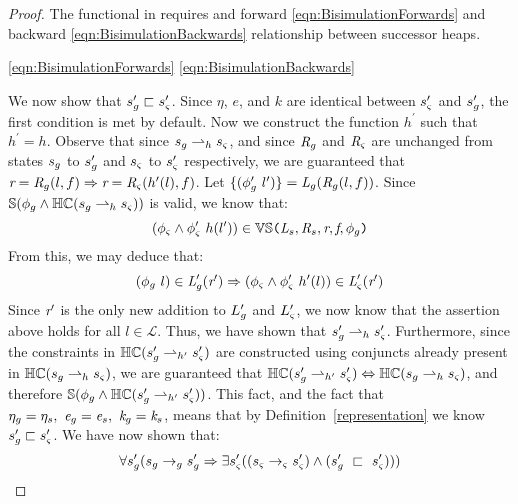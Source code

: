 \begin{proof}
The functional in  requires and forward
\eqref{eqn:BisimulationForwards} and backward
\eqref{eqn:BisimulationBackwards} relationship between successor
heaps.



\eqref{eqn:BisimulationForwards}
\eqref{eqn:BisimulationBackwards}


We now show that $s_{g}^\prime \sqsubset s_{\varsigma}^\prime$. Since $\eta$, $e$, and $k$ are identical between $s_{\varsigma}^\prime$ and $s_{g}^\prime $, the first condition is met by default. Now we construct the function $h^\prime$ such that $h^\prime = h$. Observe that since $s_{g} \rightharpoonup_{h} s_{\varsigma}$, and since $\emph{R}_{g}$ and $\emph{R}_{\varsigma}$ are unchanged from states $s_{g}$ to $s_{g}^\prime$ and $s_{\varsigma}$ to $s_{\varsigma}^\prime$ respectively, we are guaranteed that $ \emph{r} = \emph{R}_{g}(l,f) \Rightarrow \emph{r} = \emph{R}_{\varsigma}(h^\prime(l),f)$. Let $\{(\phi_{g}^\prime\ l^\prime)\} =  \emph{L}_{g}(\emph{R}_{g}(l,f))$. Since $\mathbb{S}(\phi_g \wedge \mathbb{HC}(s_{g} \rightharpoonup_{h} s_{\varsigma}))$ is valid, we know that:
 $$(\phi_{\varsigma} \wedge \phi_{\varsigma}^\prime\ h(l^\prime)) \in \mathbb{VS}\texttt{(} \emph{L}_{s},\emph{R}_{s},\emph{r},\emph{f},\phi_g\texttt{)}$$ 
From this, we may deduce that:
$$ (\phi_{g}\ l) \in \emph{L}_{g}^\prime(\emph{r}^\prime) \Rightarrow (\phi_{\varsigma} \wedge \phi_{\varsigma}^\prime\ h^\prime(l))\in \emph{L}_{\varsigma}^\prime(\emph{r}^\prime)$$
Since $\emph{r}^\prime$ is the only new addition to $L_{g}^\prime$ and $L_{\varsigma}^\prime$, we now know that the assertion above holds for all $l \in \mathcal{L}$. Thus, we have shown that $s_{g}^\prime \rightharpoonup_{h} s_{\varsigma}^\prime$. Furthermore, since the constraints in $\mathbb{HC}(s_{g}^\prime \rightharpoonup_{h^\prime} s_{\varsigma}^\prime)$ are constructed using conjuncts already present in $ \mathbb{HC}(s_{g} \rightharpoonup_{h} s_{\varsigma})$, we are guaranteed that $\mathbb{HC}(s_{g}^\prime \rightharpoonup_{h^\prime} s_{\varsigma}^\prime) \Leftrightarrow \mathbb{HC}(s_{g} \rightharpoonup_{h} s_{\varsigma})$, and therefore $\mathbb{S}(\phi_g \wedge \mathbb{HC}(s_{g}^\prime \rightharpoonup_{h^\prime} s_{\varsigma}^\prime))$. This fact, and the fact that $\eta_{g} = \eta_{s} ,\ \emph{e}_{g} = \emph{e}_{s} ,\ \emph{k}_{g} = \emph{k}_{s}$, means that by Definition~\ref{representation} we know $s_{g}^\prime \sqsubset s_{\varsigma}^\prime$. We have now shown that:
\begin{equation}
\forall s_{g}^\prime ( s_{g} \rightarrow_{g} s_{g}^\prime \Rightarrow \exists s_{\varsigma}^\prime( (s_{\varsigma} \rightarrow_{\varsigma} s_{\varsigma}^\prime )\wedge (s_{g}^\prime\ \sqsubset\ s_{\varsigma}^\prime ))  )
\end{equation}


\end{proof}
